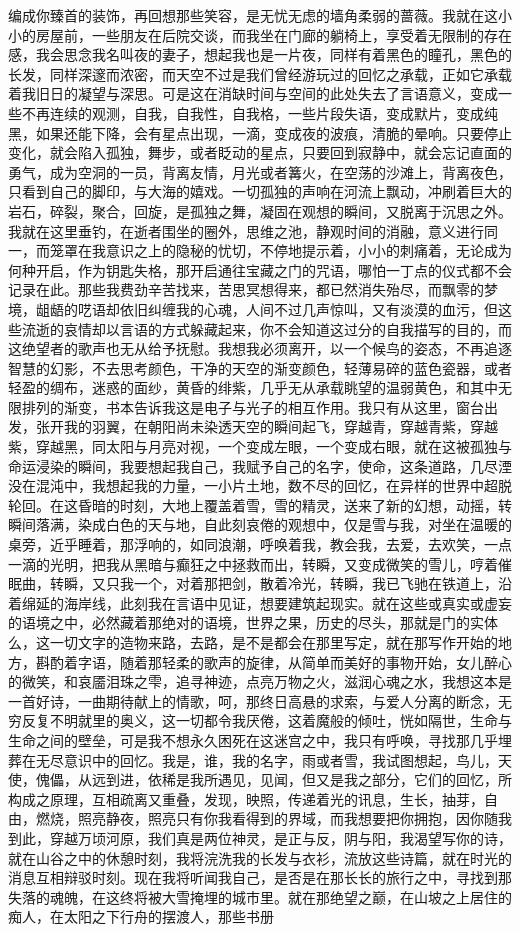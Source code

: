 \documentclass[UTF8]{article}
\begin{document}
编成你臻首的装饰，再回想那些笑容，是无忧无虑的墙角柔弱的蔷薇。我就在这小小的房屋前，一些朋友在后院交谈，而我坐在门廊的躺椅上，享受着无限制的存在感，我会思念我名叫夜的妻子，想起我也是一片夜，同样有着黑色的瞳孔，黑色的长发，同样深邃而浓密，而天空不过是我们曾经游玩过的回忆之承载，正如它承载着我旧日的凝望与深思。可是这在消缺时间与空间的此处失去了言语意义，变成一些不再连续的观测，自我，自我性，自我格，一些片段失语，变成默片，变成纯黑，如果还能下降，会有星点出现，一滴，变成夜的波痕，清脆的晕响。只要停止变化，就会陷入孤独，舞步，或者眨动的星点，只要回到寂静中，就会忘记直面的勇气，成为空洞的一员，背离友情，月光或者篝火，在空荡的沙滩上，背离夜色，只看到自己的脚印，与大海的嬉戏。一切孤独的声响在河流上飘动，冲刷着巨大的岩石，碎裂，聚合，回旋，是孤独之舞，凝固在观想的瞬间，又脱离于沉思之外。我就在这里垂钓，在逝者围坐的圈外，思维之池，静观时间的消融，意义进行同一，而笼罩在我意识之上的隐秘的忧切，不停地提示着，小小的刺痛着，无论成为何种开启，作为钥匙失格，那开启通往宝藏之门的咒语，哪怕一丁点的仪式都不会记录在此。那些我费劲辛苦找来，苦思冥想得来，都已然消失殆尽，而飘零的梦境，龃龉的呓语却依旧纠缠我的心魂，人间不过几声惊叫，又有淡漠的血污，但这些流逝的哀情却以言语的方式躲藏起来，你不会知道这过分的自我描写的目的，而这绝望者的歌声也无从给予抚慰。我想我必须离开，以一个候鸟的姿态，不再追逐智慧的幻影，不去思考颜色，干净的天空的渐变颜色，轻薄易碎的蓝色瓷器，或者轻盈的绸布，迷惑的面纱，黄昏的绯紫，几乎无从承载眺望的温弱黄色，和其中无限排列的渐变，书本告诉我这是电子与光子的相互作用。我只有从这里，窗台出发，张开我的羽翼，在朝阳尚未染透天空的瞬间起飞，穿越青，穿越青紫，穿越紫，穿越黑，同太阳与月亮对视，一个变成左眼，一个变成右眼，就在这被孤独与命运浸染的瞬间，我要想起我自己，我赋予自己的名字，使命，这条道路，几尽湮没在混沌中，我想起我的力量，一小片土地，数不尽的回忆，在异样的世界中超脱轮回。在这昏暗的时刻，大地上覆盖着雪，雪的精灵，送来了新的幻想，动摇，转瞬间落满，染成白色的天与地，自此刻哀倦的观想中，仅是雪与我，对坐在温暖的桌旁，近乎睡着，那浮响的，如同浪潮，呼唤着我，教会我，去爱，去欢笑，一点一滴的光明，把我从黑暗与癫狂之中拯救而出，转瞬，又变成微笑的雪儿，哼着催眠曲，转瞬，又只我一个，对着那把剑，散着冷光，转瞬，我已飞驰在铁道上，沿着绵延的海岸线，此刻我在言语中见证，想要建筑起现实。就在这些或真实或虚妄的语境之中，必然藏着那绝对的语境，世界之果，历史的尽头，那就是门的实体么，这一切文字的造物来路，去路，是不是都会在那里写定，就在那写作开始的地方，斟酌着字语，随着那轻柔的歌声的旋律，从简单而美好的事物开始，女儿醉心的微笑，和哀靥泪珠之雫，追寻神迹，点亮万物之火，滋润心魂之水，我想这本是一首好诗，一曲期待献上的情歌，呵，那终日高悬的求索，与爱人分离的断念，无穷反复不明就里的奥义，这一切都令我厌倦，这着魔般的倾吐，恍如隔世，生命与生命之间的壁垒，可是我不想永久困死在这迷宫之中，我只有呼唤，寻找那几乎埋葬在无尽意识中的回忆。我是，谁，我的名字，雨或者雪，我试图想起，鸟儿，天使，傀儡，从远到进，依稀是我所遇见，见闻，但又是我之部分，它们的回忆，所构成之原理，互相疏离又重叠，发现，映照，传递着光的讯息，生长，抽芽，自由，燃烧，照亮静夜，照亮只有你我看得到的界域，而我想要把你拥抱，因你随我到此，穿越万顷河原，我们真是两位神灵，是正与反，阴与阳，我渴望写你的诗，就在山谷之中的休憩时刻，我将浣洗我的长发与衣衫，流放这些诗篇，就在时光的消息互相辩驳时刻。现在我将听闻我自己，是否是在那长长的旅行之中，寻找到那失落的魂魄，在这终将被大雪掩埋的城市里。就在那绝望之巅，在山坡之上居住的痴人，在太阳之下行舟的摆渡人，那些书册
\end{document}
